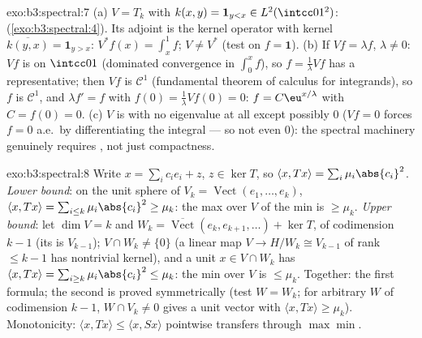 \begin{solution}{exo:b3:spectral:7}
(a) $V = T_k$ with $k(x, y) = \mathbf 1_{y < x} \in
L^2(\intcc01^2)$:  (\cref{exo:b3:spectral:4}). Its
adjoint is the kernel operator with kernel $\overline{k(y,
x)} = \mathbf 1_{y > x}$: $V^*f(x) = \int_x^1f$; $V \neq V^*$
(test on $f = \mathbf 1$).
(b) If $Vf = \lambda f$, $\lambda \ne 0$: $Vf$ is 
on $\intcc01$ (dominated convergence in $\int_0^x f$), so $f
= \frac1\lambda Vf$ has a  representative; then
$Vf$ is $\mathcal C^1$ (fundamental theorem of calculus for
 integrands), so $f$ is $\mathcal C^1$, and
$\lambda f' = f$ with $f(0) = \frac1\lambda Vf(0) = 0$: $f =
C\eu^{x/\lambda}$ with $C = f(0) = 0$.
(c) $V$ is  with no eigenvalue at all except possibly
$0$ ($Vf = 0$ forces $f = 0$ a.e.\ by differentiating the
integral --- so not even $0$): the spectral machinery
genuinely requires , not just compactness.
\end{solution}

\begin{solution}{exo:b3:spectral:8}
Write $x = \sum_ic_ie_i + z$, $z \in \ker T$, so $\langle x,
Tx\rangle = \sum_i\mu_i\abs{c_i}^2$. \emph{Lower bound}: on
the unit sphere of $V_k = \operatorname{Vect}(e_1, \dots,
e_k)$, $\langle x, Tx\rangle = \sum_{i\leq
k}\mu_i\abs{c_i}^2 \geq \mu_k$: the max over $V$ of the min
is $\geq \mu_k$. \emph{Upper bound}: let $\dim V = k$ and $W_k
= \overline{\operatorname{Vect}}(e_k, e_{k+1}, \dots) +
\ker T$, of codimension $k - 1$ (its  is
$V_{k-1}$); $V \cap W_k \neq \{0\}$ (a linear map $V \to
H/W_k \cong V_{k-1}$ of rank $\leq k - 1$ has nontrivial
kernel), and a unit $x \in V\cap W_k$ has $\langle x,
Tx\rangle = \sum_{i \geq k}\mu_i\abs{c_i}^2 \leq \mu_k$: the
min over $V$ is $\leq \mu_k$. Together: the first formula;
the second is proved symmetrically (test $W = W_k$; for
arbitrary $W$ of codimension $k-1$, $W \cap V_k \neq 0$ gives
a unit vector with $\langle x, Tx\rangle \geq \mu_k$).
Monotonicity: $\langle x, Tx\rangle \leq \langle x,
Sx\rangle$ pointwise transfers through $\max\min$.
\end{solution}

